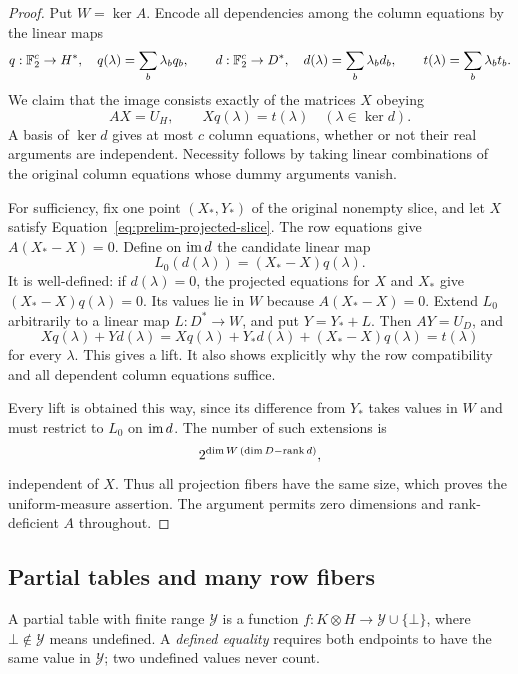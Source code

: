 \begin{proof}
Put $W=\ker A$.  Encode all dependencies among the column equations
by the linear maps
\[
 q:\mathbb F_2^c\to H^*,\quad q(\lambda)=\sum_b\lambda_bq_b,
 \qquad
 d:\mathbb F_2^c\to D^*,\quad d(\lambda)=\sum_b\lambda_bd_b,
 \qquad
 t(\lambda)=\sum_b\lambda_bt_b.
\]
We claim that the image consists exactly of the matrices $X$ obeying
\begin{equation}
 AX=U_H,\qquad Xq(\lambda)=t(\lambda)
                         \quad(\lambda\in\ker d).
 \label{eq:prelim-projected-slice}
\end{equation}
A basis of $\ker d$ gives at most $c$ column equations, whether or
not their real arguments are independent.  Necessity follows by
taking linear combinations of the original column equations whose
dummy arguments vanish.

For sufficiency, fix one point $(X_*,Y_*)$ of the original nonempty
slice, and let $X$ satisfy Equation~\eqref{eq:prelim-projected-slice}.
The row equations give $A(X_*-X)=0$.  Define on $\operatorname{im} d$ the candidate
linear map
\begin{equation}
 L_0(d(\lambda))=(X_*-X)q(\lambda).
 \label{eq:prelim-dummy-extension}
\end{equation}
It is well-defined: if $d(\lambda)=0$, the projected equations for
$X$ and $X_*$ give $(X_*-X)q(\lambda)=0$.  Its values lie in $W$
because $A(X_*-X)=0$.  Extend $L_0$ arbitrarily to a linear map
$L:D^*\to W$, and put $Y=Y_*+L$.  Then $AY=U_D$, and
\[
 Xq(\lambda)+Yd(\lambda)
 =Xq(\lambda)+Y_*d(\lambda)+(X_*-X)q(\lambda)
 =t(\lambda)
\]
for every $\lambda$.  This gives a lift.  It also shows explicitly
why the row compatibility and all dependent column equations suffice.

Every lift is obtained this way, since its difference from $Y_*$
takes values in $W$ and must restrict to $L_0$ on $\operatorname{im} d$.  The
number of such extensions is
\[
 2^{\dim W\, (\dim D-\operatorname{rank} d)},
\]
independent of $X$.  Thus all projection fibers have the same size,
which proves the uniform-measure assertion.  The argument permits
zero dimensions and rank-deficient $A$ throughout.
\end{proof}

\subsection{Partial tables and many row fibers}

A partial table with finite range $\mathcal Y$ is a function
$f:K\otimes H\to\mathcal Y\cup\{\bot\}$, where $\bot\notin\mathcal Y$
means undefined.  A \emph{defined equality} requires both endpoints to
have the same value in $\mathcal Y$; two undefined values never count.


